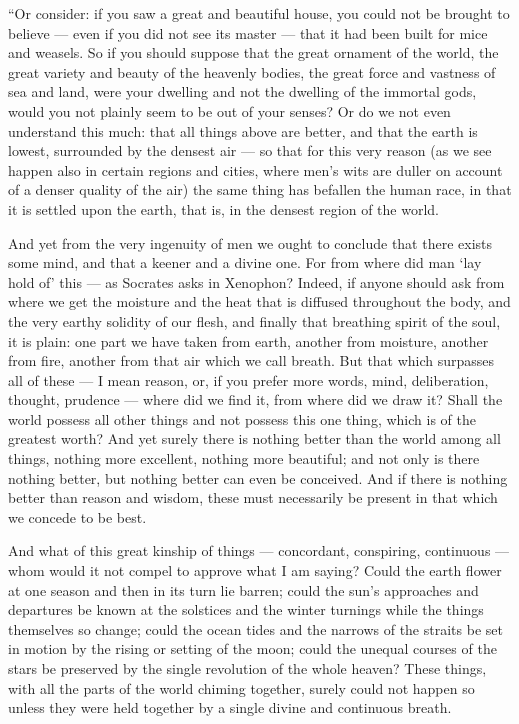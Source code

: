  ``Or consider: if you saw a great and beautiful house, you could not be brought to believe — even if you did not see its master — that it had been built for mice and weasels. So if you should suppose that the great ornament of the world, the great variety and beauty of the heavenly bodies, the great force and vastness of sea and land, were your dwelling and not the dwelling of the immortal gods, would you not plainly seem to be out of your senses? Or do we not even understand this much: that all things above are better, and that the earth is lowest, surrounded by the densest air — so that for this very reason (as we see happen also in certain regions and cities, where men's wits are duller on account of a denser quality of the air) the same thing has befallen the human race, in that it is settled upon the earth, that is, in the densest region of the world.

 And yet from the very ingenuity of men we ought to conclude that there exists some mind, and that a keener and a divine one. For from where did man `lay hold of' this — as Socrates asks in Xenophon? Indeed, if anyone should ask from where we get the moisture and the heat that is diffused throughout the body, and the very earthy solidity of our flesh, and finally that breathing spirit of the soul, it is plain: one part we have taken from earth, another from moisture, another from fire, another from that air which we call breath. But that which surpasses all of these — I mean reason, or, if you prefer more words, mind, deliberation, thought, prudence — where did we find it, from where did we draw it? Shall the world possess all other things and not possess this one thing, which is of the greatest worth? And yet surely there is nothing better than the world among all things, nothing more excellent, nothing more beautiful; and not only is there nothing better, but nothing better can even be conceived. And if there is nothing better than reason and wisdom, these must necessarily be present in that which we concede to be best.

 And what of this great kinship of things — concordant, conspiring, continuous — whom would it not compel to approve what I am saying? Could the earth flower at one season and then in its turn lie barren; could the sun's approaches and departures be known at the solstices and the winter turnings while the things themselves so change; could the ocean tides and the narrows of the straits be set in motion by the rising or setting of the moon; could the unequal courses of the stars be preserved by the single revolution of the whole heaven? These things, with all the parts of the world chiming together, surely could not happen so unless they were held together by a single divine and continuous breath.

